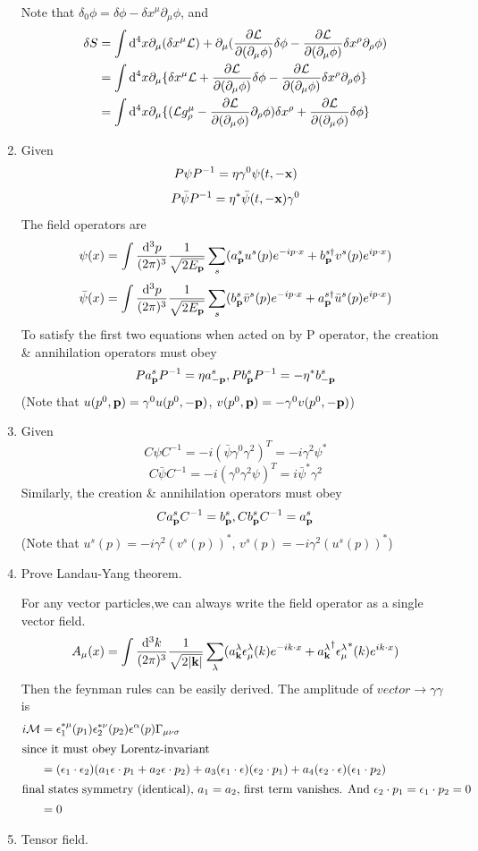 \documentclass{article}
\newcommand{\vbp}{\vb{p}}
\newcommand{\vbk}{\vb{k}}
\newcommand{\g}{\gamma}
\renewcommand{\a}{\alpha}
\newcommand{\la}{\lambda}
\newcommand{\s}{\sigma}
\newcommand{\lag}{\mathcal{L}}
\begin{document}
\begin{enumerate}[\bf1.]
\begin{align*}
  \end{align*}
  Note that $\delta_0 \phi=\delta \phi-\delta x^{\mu}\partial_{\mu}\phi$, and
  \begin{align*}
    \delta S&=\int\dd^4x \partial_{\mu}(\delta x^{\mu}\lag)+\partial_{\mu}(\pdv{\lag}{(\partial_{\mu}\phi)}\delta \phi-\pdv{\lag}{(\partial_{\mu}\phi)}\delta x^{\rho}\partial_{\rho}\phi)\\
    &=\int\dd^4x \partial_{\mu}\{\delta x^{\mu}\lag+\pdv{\lag}{(\partial_{\mu}\phi)}\delta \phi-\pdv{\lag}{(\partial_{\mu}\phi)}\delta x^{\rho}\partial_{\rho}\phi\}\\
    &=\int\dd^4x \partial_{\mu}\{(\lag g^{\mu}_{\rho}-\pdv{\lag}{(\partial_{\mu}\phi)}\partial_{\rho}\phi)\delta x^{\rho}+\pdv{\lag}{(\partial_{\mu}\phi)}\delta \phi\}
  \end{align*}
  \item Given
  $$P\psi P^{-1}=\eta\g^0\psi(t,-\vb{x})$$
  $$P\bar\psi P^{-1}=\eta^*\bar\psi(t,-\vb{x}) \g^0$$
  The field operators are
  $$\psi(x)=\int\frac{\dd^3p}{(2\pi)^3}\frac{1}{\sqrt{2E_{\vb{p}}}}\sum_s(a^s_{\vb{p}}u^s(p)e^{-ip\cdot x}+b^{s\dagger}_{\vb{p}}v^s(p)e^{ip\cdot x})$$
  $$\bar\psi(x)=\int\frac{\dd^3p}{(2\pi)^3}\frac{1}{\sqrt{2E_{\vb{p}}}}\sum_s(b^s_{\vb{p}}\bar v^s(p)e^{-ip\cdot x}+a^{s\dagger}_{\vb{p}}\bar u^s(p)e^{ip\cdot x})$$
  To satisfy the first two equations when acted on by P operator, the creation \& annihilation operators must obey
  $$Pa_{\vb{p}}^sP^{-1}=\eta a_{\vb{-p}}^s,Pb_{\vb{p}}^sP^{-1}=-\eta^* b_{\vb{-p}}^s$$
  (Note that $u(p^0,\vbp)=\g^0u(p^0,-\vbp)$, $v(p^0,\vbp)=-\g^0v(p^0,-\vbp)$)
  \item Given
  $$C\psi C^{-1}=-i(\bar\psi\g^0\g^2)^T=-i\g^2\psi^*$$
  $$C\bar\psi C^{-1}=-i(\g^0\g^2\psi)^T=i\bar\psi^*\g^2$$
  Similarly, the creation \& annihilation operators must obey
  $$Ca_{\vbp}^sC^{-1}=b_{\vbp}^s,Cb_{\vbp}^sC^{-1}=a_{\vbp}^s$$
  (Note that $u^s(p)=-i\g^2(v^s(p))^*$, $v^s(p)=-i\g^2(u^s(p))^*$)
  \item Prove Landau-Yang theorem.

	For any vector particles,we can always write the field operator as a single vector field.
  $$A_{\mu}(x)=\int\frac{\dd^3k}{(2\pi)^3}\frac{1}{\sqrt{2\abs{\vb{k}}}}\sum_{\la}(a^{\la}_{\vbk}\epsilon^{\la}_{\mu}(k)e^{-ik\cdot x}+{a^{\la}_{\vbk}}^{\dagger}{\epsilon^{\la}_{\mu}}^*(k)e^{ik\cdot x})$$
  Then the feynman rules can be easily derived. The amplitude of $vector\rightarrow \g\g$ is
  \begin{align*}
    i\mathcal{M}&=\epsilon_1^{*\mu}(p_1)\epsilon_2^{*\nu}(p_2)\epsilon^{\a}(p)\Gamma_{\mu\nu\s}\\
    \intertext{since it must obey Lorentz-invariant}
    &=(\epsilon_1\cdot\epsilon_2)(a_1\epsilon\cdot p_1+a_2\epsilon\cdot p_2)+a_3(\epsilon_1\cdot \epsilon)(\epsilon_2\cdot p_1)+a_4(\epsilon_2\cdot \epsilon)(\epsilon_1\cdot p_2)\\
    \intertext{final states symmetry (identical), $a_1=a_2$, first term vanishes. And $\epsilon_2\cdot p_1=\epsilon_1\cdot p_2=0$}
    &=0
  \end{align*}
  \item Tensor field.


\end{enumerate}
\end{document}
